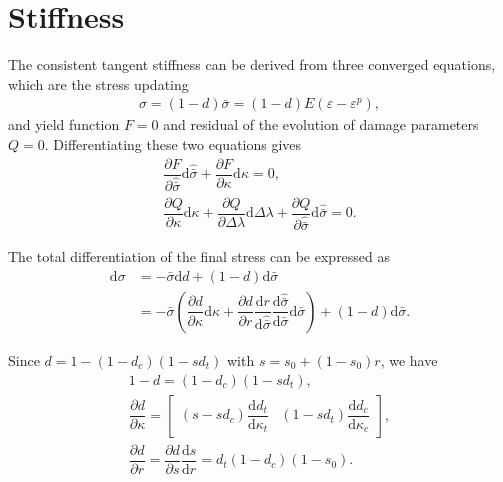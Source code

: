 \documentclass[5p]{elsarticle}
\newcommand*{\md}[1]{\mathrm{d}#1}
\newcommand*{\pdfrac}[2]{\dfrac{\partial#1}{\partial#2}}
\newcommand*{\ddfrac}[2]{\dfrac{\md#1}{\md#2}}
\begin{document}
\section{Stiffness}
The consistent tangent stiffness can be derived from three converged equations, which are the stress updating
\begin{gather*}
\sigma=\left(1-d\right)\bar{\sigma}=\left(1-d\right)E\left(\varepsilon-\varepsilon^p\right),
\end{gather*}
and yield function $F=0$ and residual of the evolution of damage parameters $Q=0$. Differentiating these two equations gives
\begin{gather*}
\pdfrac{F}{\hat{\bar{\sigma}}}\md{\hat{\bar{\sigma}}}+\pdfrac{F}{\kappa}\md{\kappa}=0,\\
\pdfrac{Q}{\kappa}\md{\kappa}+\pdfrac{Q}{\Delta\lambda}\md{\Delta\lambda}+\pdfrac{Q}{\hat{\bar{\sigma}}}\md{\hat{\bar{\sigma}}}=0.
\end{gather*}

The total differentiation of the final stress can be expressed as
\begin{equation}
\begin{split}
\md{\sigma}&=-\bar{\sigma}\md{d}+\left(1-d\right)\md{\bar{\sigma}}\\
&=-\bar{\sigma}\left(\pdfrac{d}{\kappa}\md{\kappa}+\pdfrac{d}{r}\ddfrac{r}{\hat{\bar{\sigma}}}\ddfrac{\hat{\bar{\sigma}}}{\bar{\sigma}}\md{\bar{\sigma}}\right)+\left(1-d\right)\md{\bar{\sigma}}.
\end{split}
\end{equation}

Since $d=1-\left(1-d_c\right)\left(1-sd_t\right)$ with $s=s_0+\left(1-s_0\right)r$, we have
\begin{gather*}
1-d=\left(1-d_c\right)\left(1-sd_t\right),\\
\pdfrac{d}{\kappa}=\begin{bmatrix}
\left(s-sd_c\right)\ddfrac{d_t}{\kappa_t}&\left(1-sd_t\right)\ddfrac{d_c}{\kappa_c}
\end{bmatrix},\\
\pdfrac{d}{r}=\pdfrac{d}{s}\ddfrac{s}{r}=d_t\left(1-d_c\right)\left(1-s_0\right).
\end{gather*}
\end{document}
